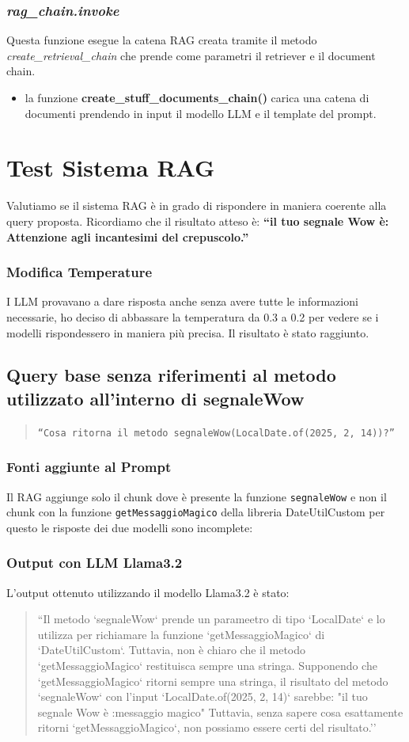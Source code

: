 \documentclass[12pt,a4paper,openright,twoside]{book}
\begin{document}
\subsubsection{\emph{rag\_chain.invoke}}
 Questa funzione esegue la catena RAG creata tramite il metodo \emph{create\_retrieval\_chain} che prende come parametri il retriever e il document chain.
 \begin{itemize}
    \item la funzione \textbf{create\_stuff\_documents\_chain()} carica una catena di documenti prendendo in input il modello LLM e il template del prompt.
 \end{itemize}
\section{Test Sistema RAG}
Valutiamo se il sistema RAG  è in grado di rispondere in maniera coerente alla query proposta.
Ricordiamo che il risultato atteso è: \textbf{``il tuo segnale Wow è: Attenzione agli incantesimi del crepuscolo.''}
\subsubsection{Modifica Temperature}
I LLM provavano a dare risposta anche senza avere tutte le informazioni necessarie, ho deciso di abbassare la temperatura da 0.3 a 0.2 per vedere se i modelli rispondessero in maniera più precisa.
Il risultato è stato raggiunto.
\subsection{Query base senza riferimenti al metodo utilizzato all'interno di segnaleWow}
\begin{quote}
    \texttt{``Cosa ritorna il metodo segnaleWow(LocalDate.of(2025, 2, 14))?''}
\end{quote}
\subsubsection{Fonti aggiunte al Prompt}
Il RAG aggiunge solo il chunk dove è presente la funzione \texttt{segnaleWow} e non il chunk con la funzione \texttt{getMessaggioMagico} della libreria DateUtilCustom
per questo le risposte dei due modelli sono incomplete:
\subsubsection{Output con LLM Llama3.2}
L'output ottenuto utilizzando il modello Llama3.2 è stato:
\begin{quote}
    ``Il metodo `segnaleWow` prende un parameetro di tipo `LocalDate` e lo utilizza per richiamare la funzione `getMessaggioMagico` di `DateUtilCustom`. Tuttavia, non è chiaro che il metodo `getMessaggioMagico` restituisca sempre una stringa.
    Supponendo che `getMessaggioMagico` ritorni sempre una stringa, il risultato del metodo `segnaleWow` con l'input `LocalDate.of(2025, 2, 14)` sarebbe:
    "il tuo segnale Wow è :messaggio magico"
    Tuttavia, senza sapere cosa esattamente ritorni `getMessaggioMagico`, non possiamo essere certi del risultato.''
\end{quote}
\end{document}
